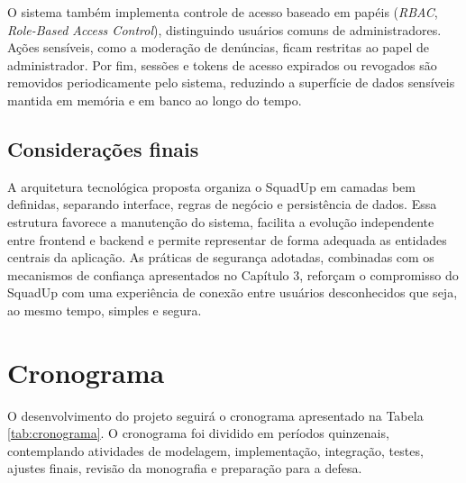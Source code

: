 \documentclass[a4paper, 12pt]{article}
\begin{document}
\begin{justify}
O sistema também implementa controle de acesso baseado em papéis (\textit{RBAC}, \textit{Role-Based Access Control}), distinguindo usuários comuns de administradores. Ações sensíveis, como a moderação de denúncias, ficam restritas ao papel de administrador. Por fim, sessões e tokens de acesso expirados ou revogados são removidos periodicamente pelo sistema, reduzindo a superfície de dados sensíveis mantida em memória e em banco ao longo do tempo.

\subsection{Considerações finais}

A arquitetura tecnológica proposta organiza o SquadUp em camadas bem definidas, separando interface, regras de negócio e persistência de dados. Essa estrutura favorece a manutenção do sistema, facilita a evolução independente entre frontend e backend e permite representar de forma adequada as entidades centrais da aplicação. As práticas de segurança adotadas, combinadas com os mecanismos de confiança apresentados no Capítulo 3, reforçam o compromisso do SquadUp com uma experiência de conexão entre usuários desconhecidos que seja, ao mesmo tempo, simples e segura.

\clearpage

\section{Cronograma}

O desenvolvimento do projeto seguirá o cronograma apresentado na Tabela \ref{tab:cronograma}. O cronograma foi dividido em períodos quinzenais, contemplando atividades de modelagem, implementação, integração, testes, ajustes finais, revisão da monografia e preparação para a defesa.

\begin{table}[H]
\centering
\caption{Cronograma de Desenvolvimento do Projeto}
\label{tab:cronograma}
\scriptsize
{}
\end{table}
\end{justify}
\end{document}
